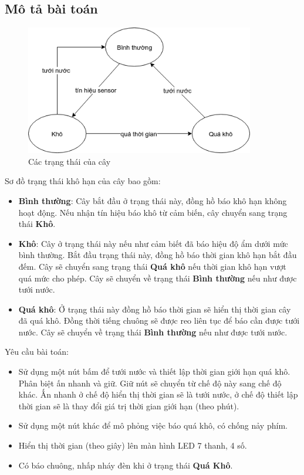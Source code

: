 \documentclass[../report.tex]{subfiles}
\begin{document}
\subsection{Mô tả bài toán}
\begin{figure}[H]
\centering
\includegraphics[width=10cm]{figures/state.png}
\caption{Các trạng thái của cây}
\end{figure}

Sơ đồ trạng thái khô hạn của cây bao gồm: 
\begin{itemize}
    \item \textbf{Bình thường}: Cây bắt đầu ở trạng thái này, đồng hồ báo khô hạn không hoạt động. Nếu nhận tín hiệu báo khô từ 
        cảm biến, cây chuyển sang trạng thái \textbf{Khô}.
    \item \textbf{Khô}: Cây ở trạng thái này nếu như cảm biết đã báo hiệu độ ẩm dưới mức bình thường. 
        Bắt đầu trạng thái này, đồng hồ báo thời gian khô hạn bắt đầu đếm. Cây sẽ chuyển sang trạng thái \textbf{Quá khô}
        nếu thời gian khô hạn vượt quá mức cho phép. Cây sẽ chuyển về trạng thái \textbf{Bình thường} nếu như được tưới nước. 
    \item \textbf{Quá khô}: Ở trạng thái này đồng hồ báo thời gian sẽ hiển thị thời gian cây đã quá khô. Đồng thời 
        tiếng chuông sẽ được reo liên tục để báo cần được tưới nước. Cây sẽ chuyển về trạng thái \textbf{Bình thường} nếu như 
        được tưới nước. 
\end{itemize}

\noindent Yêu cầu bài toán: 
\begin{itemize}
    \item Sử dụng một nút bấm để tưới nước và thiết lập thời gian giới hạn quá khô. Phân biệt ấn nhanh và giữ. 
        Giữ nút sẽ chuyển từ chế độ này sang chế độ khác. Ấn nhanh ở chế độ hiển thị thời gian sẽ là tưới nước, ở chế 
        độ thiết lập thời gian sẽ là thay đổi giá trị thời gian giới hạn (theo phút). 
    \item Sử dụng một nút khác để mô phỏng việc báo quá khô, có chống nảy phím. 
    \item Hiển thị thời gian (theo giây) lên màn hình LED 7 thanh, 4 số. 
    \item Có báo chuông, nhấp nháy đèn khi ở trạng thái \textbf{Quá Khô}.
\end{itemize}
\end{document}

